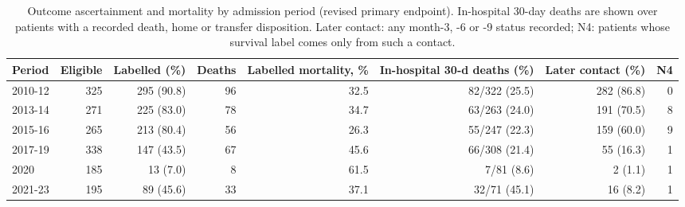 \begin{table}[htbp]\centering\scriptsize
\caption{Outcome ascertainment and mortality by admission period (revised primary endpoint). In-hospital 30-day deaths are shown over patients with a recorded death, home or transfer disposition. Later contact: any month-3, -6 or -9 status recorded; N4: patients whose survival label comes only from such a contact.}\label{tab:period}
\begin{tabular}{lrrrrrrr}
\toprule
Period & Eligible & Labelled (\%) & Deaths & Labelled mortality, \% & In-hospital 30-d deaths (\%) & Later contact (\%) & N4 \\
\midrule
2010-12 & 325 & 295 (90.8) & 96 & 32.5 & 82/322 (25.5) & 282 (86.8) & 0 \\
2013-14 & 271 & 225 (83.0) & 78 & 34.7 & 63/263 (24.0) & 191 (70.5) & 8 \\
2015-16 & 265 & 213 (80.4) & 56 & 26.3 & 55/247 (22.3) & 159 (60.0) & 9 \\
2017-19 & 338 & 147 (43.5) & 67 & 45.6 & 66/308 (21.4) & 55 (16.3) & 1 \\
2020 & 185 & 13 (7.0) & 8 & 61.5 & 7/81 (8.6) & 2 (1.1) & 1 \\
2021-23 & 195 & 89 (45.6) & 33 & 37.1 & 32/71 (45.1) & 16 (8.2) & 1 \\
\bottomrule
\end{tabular}
\end{table}
